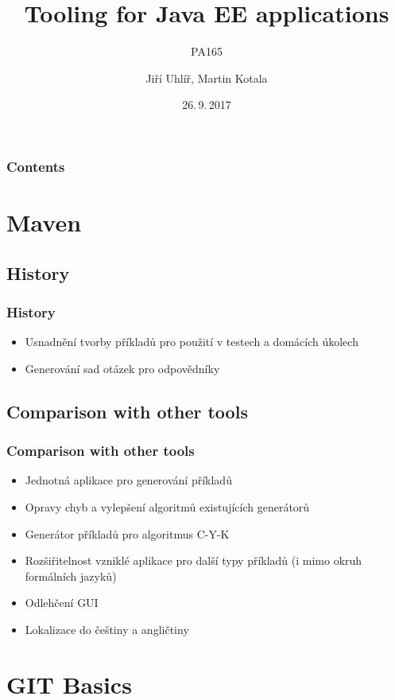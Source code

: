 \documentclass[pdf,compress]{beamer}
\title{Tooling for Java EE applications}
\subtitle{PA165}
\date{26.\,9.\,2017}
\author{Jiří Uhlíř, Martin Kotala}
\begin{document}
\frame{\titlepage}

\section[]{}
\begin{frame}
\frametitle{Contents}
\tableofcontents[hideallsubsections]
\end{frame}


\section[Maven]{Maven}
\subsection[]{History}
\begin{frame}
\frametitle{History}
\begin{itemize}
\item Usnadnění tvorby příkladů pro použití v testech a domácích úkolech
\item Generování sad otázek pro odpovědníky
\end{itemize}
\end{frame}

\subsection[]{Comparison with other tools}
\begin{frame}
\frametitle{Comparison with other tools}
\begin{itemize}
\item Jednotná aplikace pro generování příkladů
\item Opravy chyb a vylepšení algoritmů existujících generátorů \pause
\item Generátor příkladů pro algoritmus C-Y-K \pause
\item Rozšiřitelnost vzniklé aplikace pro další typy příkladů (i mimo okruh formálních jazyků) \pause
\item Odlehčení GUI \pause
\item Lokalizace do češtiny a angličtiny
\end{itemize}

\end{frame}

\section[GIT Basics]{GIT Basics}
\end{document}
